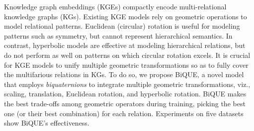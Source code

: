 Knowledge graph embeddings (KGEs) compactly encode multi-relational knowledge graphs (KGs). Existing KGE models rely on geometric operations to model relational patterns. Euclidean (circular) rotation is useful for modeling patterns such as symmetry, but cannot represent hierarchical semantics. In contrast, hyperbolic models are effective at modeling hierarchical relations, but do not perform as well on patterns on which circular rotation excels. It is crucial for KGE models to unify multiple geometric transformations so as to fully cover the multifarious relations in KGs. To do so, we propose BiQUE, a novel model that employs {\it biquaternions} to integrate multiple geometric transformations, viz., scaling, translation, Euclidean rotation, and hyperbolic rotation. BiQUE makes the best trade-offs among geometric operators during training, picking the best one (or their best combination) for each relation. Experiments on five datasets show BiQUE's effectiveness.
